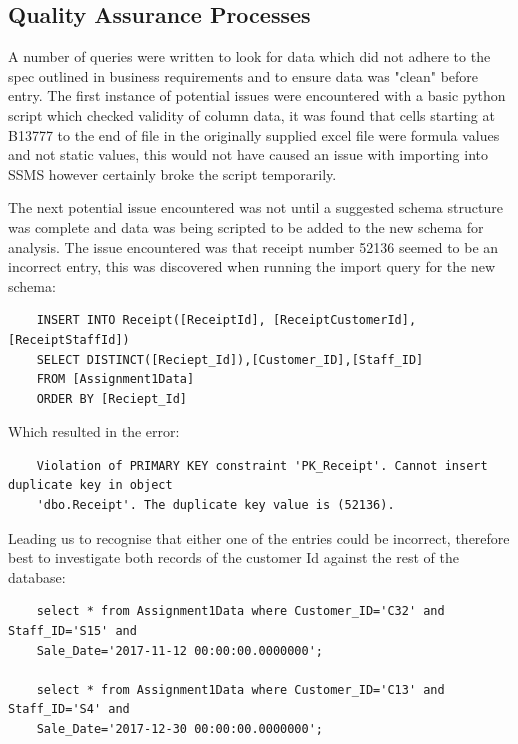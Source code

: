 \documentclass{article}
\newcounter{num}
\begin{document}
        \subsection{Quality Assurance Processes}
            A number of queries were written to look for data which did not adhere to the spec
            outlined in business requirements and to ensure data was "clean" before entry.
            The first instance of potential issues were encountered with a basic python script
            which checked validity of column data, it was found that cells starting at B13777
            to the end of file in the originally supplied excel file were formula values and 
            not static values, this would not have caused an issue with importing into SSMS 
            however certainly broke the script temporarily.
            \vspace{5mm}
            \par\noindent
            The next potential issue encountered was not until a suggested schema structure 
            was complete and data was being scripted to be added to the new schema for analysis.
            The issue encountered was that receipt number 52136 seemed to be an incorrect 
            entry, this was discovered when running the import query for the new schema:
            \begin{verbatim}
    INSERT INTO Receipt([ReceiptId], [ReceiptCustomerId],[ReceiptStaffId])
    SELECT DISTINCT([Reciept_Id]),[Customer_ID],[Staff_ID]
    FROM [Assignment1Data]
    ORDER BY [Reciept_Id]
            \end{verbatim}
            Which resulted in the error:
            \color{red}
            \begin{verbatim}
    Violation of PRIMARY KEY constraint 'PK_Receipt'. Cannot insert duplicate key in object 
    'dbo.Receipt'. The duplicate key value is (52136).
            \end{verbatim}
            \color{black}
            Leading us to recognise that either one of the entries could be incorrect, therefore
            best to investigate both records of the customer Id against the rest of the database:
            \begin{verbatim}
    select * from Assignment1Data where Customer_ID='C32' and Staff_ID='S15' and 
    Sale_Date='2017-11-12 00:00:00.0000000';

    select * from Assignment1Data where Customer_ID='C13' and Staff_ID='S4' and 
    Sale_Date='2017-12-30 00:00:00.0000000';
            \end{verbatim}
\end{document}
